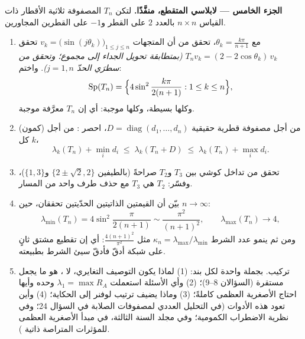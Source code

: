 \begin{problem}
\medskip
\noindent\textbf{الجزء الخامس --- لابلاسي المتقطع، منفَّذًا.}
لتكن $T_n$ المصفوفة ثلاثية الأقطار ذات القياس $n \times n$ بالعدد $2$ على
القطر و$-1$ على القطرين المجاورين.
\begin{enumerate}[resume]
  \item مع $\theta_k = \frac{k\pi}{n+1}$، تحقق من أن
        المتجهات $v_k = \bigl(\sin(j\theta_k)\bigr)_{1\leq j\leq
        n}$ تحقق $T_nv_k = (2 - 2\cos\theta_k)\,v_k$
        \emph{(بمتطابقة تحويل الجداء إلى مجموع؛ وتحقق من سطرَي الحدّ
        $j = 1, n$)}. واختم:
        \[
        \operatorname{Sp}(T_n) = \Bigl\{4\sin^2
        \frac{k\pi}{2(n+1)} : 1 \leq k \leq n\Bigr\},
        \]
        وكلها بسيطة، وكلها موجبة: أي إن $T_n$ معرَّفة موجبة.
  \item (كمون) من أجل مصفوفة قطرية حقيقية $D =
        \operatorname{diag}(d_1, \dots, d_n)$، احصر
        : من أجل كل $k$،
        \[
        \lambda_k(T_n) + \min_i d_i \;\leq\;
        \lambda_k(T_n + D) \;\leq\; \lambda_k(T_n) + \max_i
        d_i .
        \]
  \item تحقق من تداخل كوشي بين $T_3$ و$T_2$
        صراحةً (بالطيفين $\{2 \pm \sqrt2, 2\}$ و$\{1,
        3\}$)، وفسّر: $T_2$ هي $T_3$ مع حذف طرف
        واحد من المسار.
  \item بيّن أن القيمتين الذاتيتين الحدّيتين تحققان، حين $n \to
        \infty$:
        \[
        \lambda_{\min}(T_n) = 4\sin^2\frac{\pi}{2(n+1)}
        \sim \frac{\pi^2}{(n+1)^2},
        \qquad
        \lambda_{\max}(T_n) \to 4 ,
        \]
        ومن ثم ينمو عدد الشرط $\kappa_n =
        \lambda_{\max}/\lambda_{\min}$ مثل
        $\frac{4(n+1)^2}{\pi^2}$: أي إن تقطيع مشتق ثانٍ على شبكة أدقّ
        فأدقّ سيئ الشرط
        بطبيعته.
  \item تركيب. بجملة واحدة لكل بند: (1) لماذا يكون التوصيف
        التغايري، لا ، هو ما يجعل  مستقرة (السؤالان 8--9)؛ (2) وأي الأسئلة استعملت
        $\lambda_1 = \max R_A$ وحده وأيها احتاج الأصغرية العظمى
        كاملةً؛ (3) وماذا يضيف ترتيب لوفنر إلى
        الحكاية؛ (4) وأين تعود هذه الأدوات (في التحليل
        العددي لمصفوفات الصلابة في السؤال 24؛ وفي نظرية
        الاضطراب الكمومية؛ وفي مجلد السنة الثالثة، في مبدأ
        الأصغرية العظمى للمؤثرات المتراصة ذاتية
        ).
\end{enumerate}
\end{problem}

